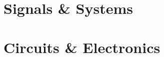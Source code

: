 \documentclass[letterpaper, 11pt]{report}
\begin{document}
	




\part{Signals \& Systems}
%




\part{Circuits \& Electronics}









\end{document}
